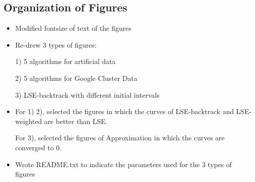 \subsection*{Organization of Figures}
\begin{itemize}
	\item Modified fontsize of text of the figures
	\item Re-drew 3 types of figures:
	
	1) 5 algorithms for artificial data 
	
	2) 5 algorithms for Google Cluster Data
	
	3) LSE-backtrack with different initial intervals
	
	\item For 1) 2), selected the figures in which the curves of LSE-backtrack and LSE-weighted are better than LSE.
	
	For 3), selected the figures of Approximation in which the curves are converged to 0.
	
	\item Wrote README.txt to indicate the parameters used for the 3 types of figures


\end{itemize}